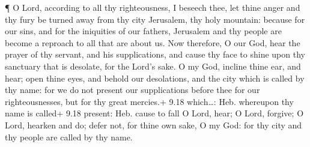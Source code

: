  ¶ O Lord, according to all thy righteousness, I beseech
thee, let thine anger and thy fury be turned away from thy city
Jerusalem, thy holy mountain: because for our sins, and for the
iniquities of our fathers, Jerusalem and thy people are become a
reproach to all that are about us.  Now therefore, O our
God, hear the prayer of thy servant, and his supplications, and cause
thy face to shine upon thy sanctuary that is desolate, for the Lord's
sake.  O my God, incline thine ear, and hear; open thine
eyes, and behold our desolations, and the city which is called by thy
name: for we do not present our supplications before thee for our
righteousnesses, but for thy great mercies.+ 9.18 which\ldots: Heb.
whereupon thy name is called+ 9.18 present: Heb. cause to fall
 O Lord, hear; O Lord, forgive; O Lord, hearken and do;
defer not, for thine own sake, O my God: for thy city and thy people are
called by thy name.

